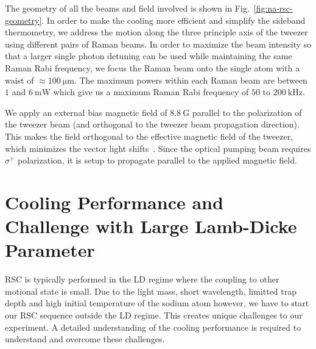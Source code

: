The geometry of all the beams and field involved is shown in Fig.~\ref{fig:na-rsc-geometry}.
In order to make the cooling more efficient and simplify the sideband thermometry,
we address the motion along the three principle axis of the tweezer using different pairs
of Raman beams.
In order to maximize the beam intensity so that a larger single photon detuning can be used
while maintaining the same Raman Rabi frequency,
we focus the Raman beam onto the single atom with a waist of $\approx100~\mathrm{\mu m}$.
The maximum powers within each Raman beam are between $1$ and $6~\mathrm{mW}$
which give us a maximum Raman Rabi frequency of $50$ to $200~\mathrm{kHz}$.

We apply an external bias magnetic field of $8.8~\mathrm{G}$ parallel to the polarization
of the tweezer beam (and orthogonal to the tweezer beam propagation direction).
This makes the field orthogonal to the effective magnetic field of the tweezer,
which minimizes the vector light shifts~\cite{kaufman_cooling_2012,thompson_coherence_2013}.
Since the optical pumping beam requires $\sigma^+$ polarization,
it is setup to propagate parallel to the applied magnetic field.

\section{Cooling Performance and Challenge with Large Lamb-Dicke Parameter}
\label{ch:rsc-challenges}

RSC is typically performed in the LD regime where the coupling
to other motional state is small.
Due to the light mass, short wavelength, limitted trap depth and high initial temperature
of the sodium atom however, we have to start our RSC sequence outside the LD regime.
This creates unique challenges to our experiment.
A detailed understanding of the cooling performance is required to understand
and overcome these challenges.

